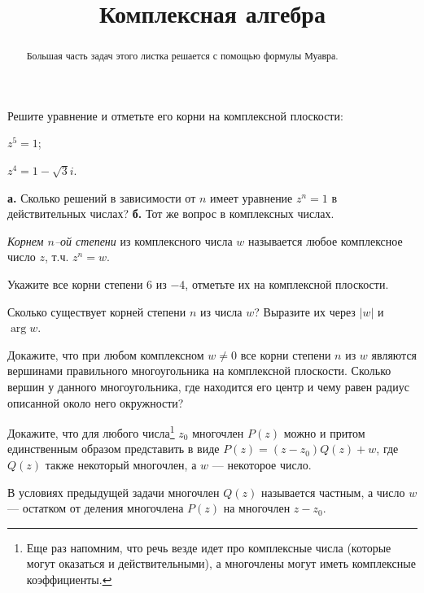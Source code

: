 \documentclass[a4paper, 12pt, num=22]{listok}
\begin{document}
\title{Комплексная алгебра}
\maketitle{}
\begin{abstract}
	Большая часть задач этого листка решается с помощью формулы Муавра.
\end{abstract}
\begin{problem}
	Решите уравнение и отметьте его корни на комплексной плоскости:
	\begin{multienum}{2}
		\item $z^5 = 1$;
		\item $z^4 = 1 - \sqrt3i$.
	\end{multienum}
\end{problem}
\begin{problem}
	\textbf{а.} Сколько решений в зависимости от $n$ имеет уравнение $z^n = 1$ в действительных числах?
	\textbf{б.} Тот же вопрос в комплексных числах.
\end{problem}
\begin{definition}
	\textit{Корнем $n$--ой степени} из комплексного числа $w$ называется любое комплексное число $z$, т.ч. $z^n = w$.
\end{definition}
\begin{problem}
	Укажите все корни степени $6$ из $-4$, отметьте их на комплексной плоскости.
\end{problem}
\begin{problem}
	Сколько существует корней степени $n$ из числа $w$? Выразите их через $|w|$ и $\arg w$.
\end{problem}
\begin{problem}
	Докажите, что при любом комплексном $w \ne 0$ все корни степени $n$ из $w$ являются
	вершинами правильного многоугольника на комплексной плоскости.
	Сколько вершин у данного многоугольника,
	где находится его центр и чему равен радиус описанной около него окружности?
\end{problem}
\begin{problem}
	Докажите, что для любого числа\footnote{Еще раз напомним, что речь везде идет про комплексные числа
	(которые могут оказаться и действительными), а многочлены могут иметь комплексные коэффициенты.}
	$z_0$ многочлен $P(z)$ можно и притом единственным образом представить в виде $P(z) = (z - z_0)Q(z) + w$,
	где $Q(z)$ также некоторый многочлен, а $w$ --- некоторое число.
\end{problem}
\begin{definition}
	В условиях предыдущей задачи многочлен $Q(z)$ называется частным,
	а число $w$ --- остатком от деления многочлена $P(z)$ на многочлен $z - z_0$.
\end{definition}
\end{document}
